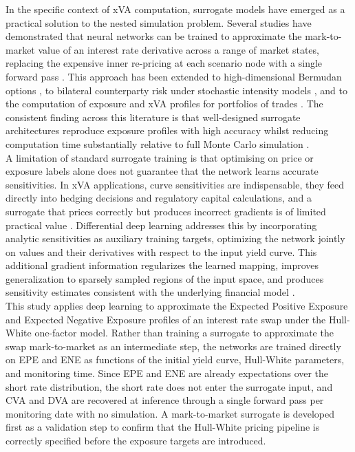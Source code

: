     \noindent
    In the specific context of xVA computation, surrogate models have emerged as a practical solution to the nested simulation problem. Several studies have demonstrated that neural networks can be trained to approximate the mark-to-market value of an interest rate derivative across a range of market states, replacing the expensive inner re-pricing at each scenario node with a single forward pass \cite{frode2022neural, menegon2023real}. This approach has been extended to high-dimensional Bermudan options \cite{andersson2021deep}, to bilateral counterparty risk under stochastic intensity models \cite{gnoatto2022deep}, and to the computation of exposure and xVA profiles for portfolios of trades \cite{zhu2019applying}. The consistent finding across this literature is that well-designed surrogate architectures reproduce exposure profiles with high accuracy whilst reducing computation time substantially relative to full Monte Carlo simulation \cite{deelstra2024accelerated}. \\

    \noindent
    A limitation of standard surrogate training is that optimising on price or exposure labels alone does not guarantee that the network learns accurate sensitivities. In xVA applications, curve sensitivities are indispensable, they feed directly into hedging decisions and regulatory capital calculations, and a surrogate that prices correctly but produces incorrect gradients
    is of limited practical value \cite{deelstra2024accelerated}. Differential deep learning addresses this by incorporating analytic sensitivities as auxiliary training targets, optimizing the network jointly on values and their derivatives with respect to the input yield curve. This additional gradient information regularizes the learned mapping, improves generalization to sparsely sampled regions of the input space, and produces sensitivity estimates consistent with the underlying financial model \cite{lee2026deeponet}.\\

    \noindent
    This study applies deep learning to approximate the Expected Positive Exposure and Expected Negative Exposure profiles of an interest rate swap under the Hull-White one-factor model. Rather than training a surrogate to approximate the swap mark-to-market as an intermediate step, the networks are trained directly on EPE and ENE as functions of the initial yield curve, Hull-White parameters, and monitoring time. Since EPE and ENE are already expectations over the short rate distribution, the short rate does not enter the surrogate input, and CVA and DVA are recovered at inference through a single forward pass per monitoring date with no simulation. A mark-to-market surrogate is developed first as a validation step to confirm that the Hull-White pricing pipeline is correctly specified before the exposure targets are introduced. \\


